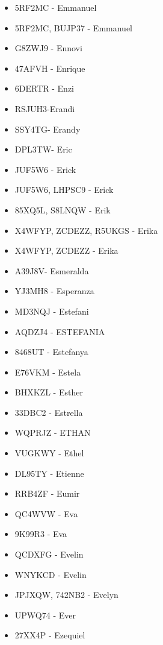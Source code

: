 \begin{itemize}[leftmargin=*,nosep]
\item 5RF2MC - Emmanuel
\item 5RF2MC, BUJP37 - Emmanuel
\item G8ZWJ9 - Ennovi
\item 47AFVH - Enrique
\item 6DERTR - Enzi
\item RSJUH3-Erandi
\item SSY4TG- Erandy
\item DPL3TW- Eric
\item JUF5W6 - Erick
\item JUF5W6, LHPSC9 - Erick
\item 85XQ5L, S8LNQW - Erik
\item X4WFYP, ZCDEZZ, R5UKGS - Erika
\item X4WFYP, ZCDEZZ - Erika
\item A39J8V- Esmeralda
\item YJ3MH8 - Esperanza
\item MD3NQJ - Estefani
\item AQDZJ4 - ESTEFANIA
\item 8468UT - Estefanya
\item E76VKM - Estela
\item BHXKZL - Esther
\item 33DBC2 - Estrella
\item WQPRJZ - ETHAN
\item VUGKWY - Ethel
\item DL95TY - Etienne
\item RRB4ZF - Eumir
\item QC4WVW - Eva
\item 9K99R3 - Eva
\item QCDXFG - Evelin
\item WNYKCD - Evelin
\item JPJXQW, 742NB2 - Evelyn
\item UPWQ74 - Ever
\item 27XX4P - Ezequiel
\end{itemize}

